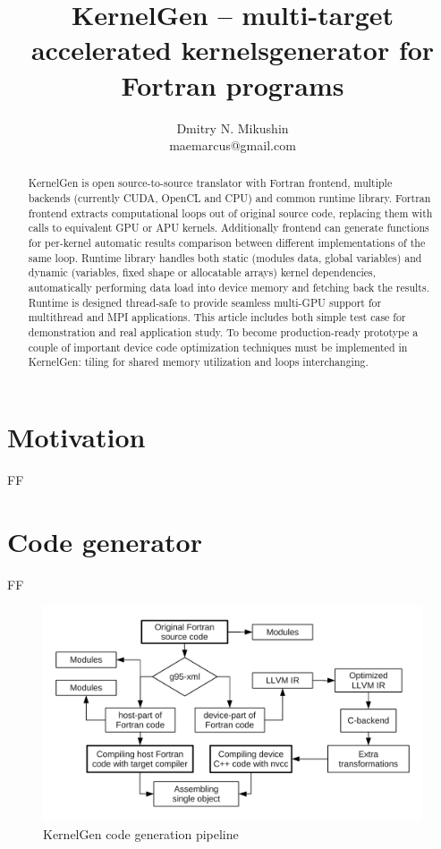 \documentclass[a4,12pt]{article}
\title{KernelGen -- multi-target accelerated kernels\linebreak generator for Fortran programs}
\author{Dmitry N. Mikushin\\ maemarcus@gmail.com}
\begin{document}
\maketitle

\begin{abstract}

KernelGen is open source-to-source translator with Fortran frontend, multiple backends (currently CUDA, OpenCL and CPU) and common runtime library. Fortran frontend extracts computational loops out of original source code, replacing them with calls to equivalent GPU or APU kernels. Additionally frontend can generate functions for per-kernel automatic results comparison between different implementations of the same loop. Runtime library handles both static (modules data, global variables) and dynamic (variables, fixed shape or allocatable arrays) kernel dependencies, automatically performing data load into device memory and fetching back the results. Runtime is designed thread-safe to provide seamless multi-GPU support for multithread and MPI applications. This article includes both simple test case for demonstration and real application study. To become production-ready prototype a couple of important device code optimization techniques must be implemented in KernelGen: tiling for shared memory utilization and loops interchanging.

\end{abstract}

\section{Motivation}

FF

\section{Code generator}

FF

\begin{figure}
\centering
\includegraphics[scale=0.5]{figures/pipeline.pdf}
\caption{KernelGen code generation pipeline}
\label{fig:pipeline}
\end{figure}
\end{document}
